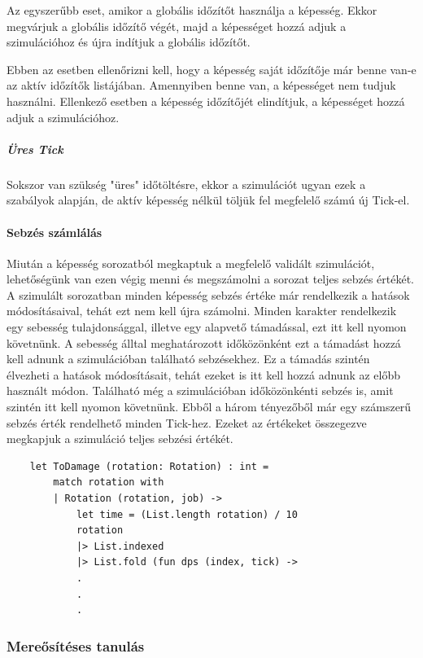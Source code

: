 \documentclass[12pt]{article}
\begin{document}
	\begin{description}[align=right,labelwidth=3cm]
		\item [GCD] Az egyszerűbb eset, amikor a globális időzítőt használja a képesség. Ekkor megvárjuk a globális időzítő végét, majd a képességet hozzá adjuk a szimulációhoz és újra indítjuk a globális időzítőt.
		\item [OGCD] Ebben az esetben ellenőrizni kell, hogy a képesség saját időzítője már benne van-e az aktív időzítők listájában. Amennyiben benne van, a képességet nem tudjuk használni. Ellenkező esetben a képesség időzítőjét elindítjuk, a képességet hozzá adjuk a szimulációhoz.
	\end{description}
	
	\subparagraph{Üres Tick}
	Sokszor van szükség "üres" időtöltésre, ekkor a szimulációt ugyan ezek a szabályok alapján, de aktív képesség nélkül töljük fel megfelelő számú új Tick-el.
	
	\paragraph{Sebzés számlálás}
	
	Miután a képesség sorozatból megkaptuk a megfelelő validált szimulációt, lehetőségünk van ezen végig menni és megszámolni a sorozat teljes sebzés értékét. A szimulált sorozatban minden képesség sebzés értéke már rendelkezik a hatások módosításaival, tehát ezt nem kell újra számolni. 
	Minden karakter rendelkezik egy sebesség tulajdonsággal, illetve egy alapvető támadással, ezt itt kell nyomon követnünk. A sebesség álltal meghatározott időközönként ezt a támadást hozzá kell adnunk a szimulációban található sebzésekhez. Ez a támadás szintén élvezheti a hatások módosításait, tehát ezeket is itt kell hozzá adnunk az előbb használt módon.
	Található még a szimulációban időközönkénti sebzés is, amit szintén itt kell nyomon követnünk.
	\newline
	Ebből a három tényezőből már egy számszerű sebzés érték rendelhető minden Tick-hez. Ezeket az értékeket összegezve megkapjuk a szimuláció teljes sebzési értékét.
	
	\begin{lstlisting}
	let ToDamage (rotation: Rotation) : int =
		match rotation with
		| Rotation (rotation, job) ->
			let time = (List.length rotation) / 10
			rotation
			|> List.indexed
			|> List.fold (fun dps (index, tick) ->
			.
			.
			.
	\end{lstlisting}
	
	\subsubsection{Mereősítéses tanulás}
	
\end{document}
